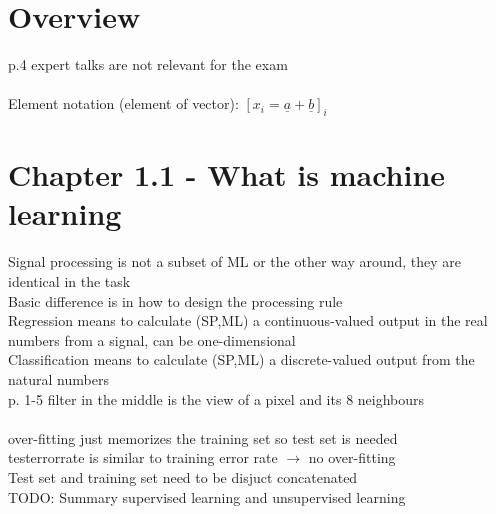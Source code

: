 

%





\section{Overview}
\textbullet p.4 expert talks are not relevant for the exam \\
 \\
\textbullet Element notation (element of vector): $ [x_i = \underline{a} + \underline{b}]_i$

\section{Chapter 1.1 - What is machine learning}
\textbullet Signal processing is not a subset of ML or the other way around, they are identical in the task \\
\textbullet Basic difference is in how to design the processing rule \\
\textbullet Regression means to calculate (SP,ML) a continuous-valued output in the real numbers from a signal, can be one-dimensional \\
\textbullet Classification means to calculate (SP,ML) a discrete-valued output from the natural numbers \\
\textbullet p. 1-5 filter in the middle is the view of a pixel and its 8 neighbours \\
 \\
\textbullet over-fitting just memorizes the training set so test set is needed \\
\textbullet testerrorrate is similar to training error rate $\rightarrow$ no over-fitting \\
\textbullet Test set and training set need to be disjuct concatenated \\
\textbullet TODO: Summary supervised learning and unsupervised learning
